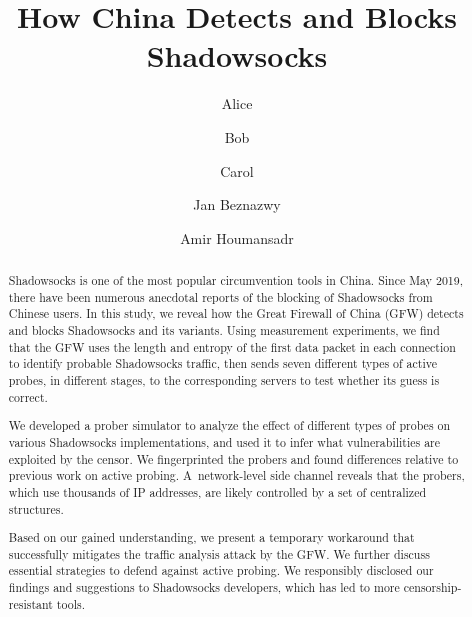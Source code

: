 \documentclass[sigconf,letterpaper]{acmart}
\begin{document}

\date{}

\title{How China Detects and Blocks Shadowsocks}

\author{Alice}
\author{Bob}
\author{Carol}
\author{Jan Beznazwy}
\author{Amir Houmansadr}
\renewcommand{\shortauthors}{Alice et al.}

\begin{abstract}

    Shadowsocks is one of the most popular circumvention tools in China.
    Since May 2019, there have been numerous anecdotal reports of the blocking of Shadowsocks from Chinese users.
    In this study, we reveal how the Great Firewall of China (GFW) detects and blocks Shadowsocks and its variants.
    Using measurement experiments,
    we find that the GFW uses the length and entropy of the first data packet in each connection to identify probable Shadowsocks traffic,
    then sends seven different types of active probes, in different stages, to the corresponding servers to test whether its guess is correct.

    We developed a prober simulator
    to analyze the effect of different types of probes on various Shadowsocks implementations,
    and used it to infer what vulnerabilities are exploited by the censor.
    We fingerprinted the probers and found differences relative to previous work on active probing.
    A~network-level side channel reveals that the probers, which use thousands of IP addresses, are likely controlled by a set of centralized structures.

    Based on our gained understanding,
    we present a temporary workaround that successfully mitigates the traffic analysis attack by the GFW.
    We further discuss essential strategies to defend against active probing.
    We responsibly disclosed our findings and suggestions to Shadowsocks developers, which has led to more censorship-resistant tools.

\end{abstract}
\end{document}
